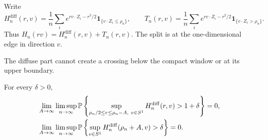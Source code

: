 Write
\[
    H_n^{\mathrm{diff}}(r,v)=\frac1n\sum_i e^{rv\cdot Z_i-r^2/2}
        \mathbf 1_{\{v\cdot Z_i\le \rho_n\}},
    \qquad
    T_n(r,v)=\frac1n\sum_i e^{rv\cdot Z_i-r^2/2}
        \mathbf 1_{\{v\cdot Z_i> \rho_n\}} .
\]
Thus \(H_n(rv)=H_n^{\mathrm{diff}}(r,v)+T_n(r,v)\).  The split is at the
one-dimensional edge in direction \(v\).

The diffuse part cannot create a crossing below the compact window or at its
upper boundary.
\begin{lemma}
\label{lem:d-two-diffuse-outside}
For every \(\delta>0\),
\[
\begin{aligned}
    &\lim_{A\to\infty}\limsup_{n\to\infty}
    \mathbb P\left\{
        \sup_{\rho_n/2\le r\le \rho_n-A,\ v\in S^1}
        H_n^{\mathrm{diff}}(r,v)>1+\delta
    \right\}=0,\\
    &\lim_{A\to\infty}\limsup_{n\to\infty}
    \mathbb P\left\{
        \sup_{v\in S^1}H_n^{\mathrm{diff}}(\rho_n+A,v)>\delta
    \right\}=0 .
\end{aligned}
\]
\end{lemma}

